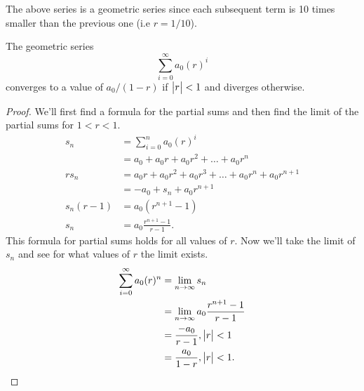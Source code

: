 The above series is a geometric series since each subsequent term is 10 times smaller than the previous one (i.e $r=1/10$).
\begin{lemma}
	The geometric series
	\begin{equation*}
		\sum_{i=0}^{\infty}{a_0(r)^i}
	\end{equation*}
	converges to a value of $a_0/(1-r)$ if $\big\lvert r \big\rvert < 1$ and diverges otherwise.
\end{lemma}
\begin{proof}
	We'll first find a formula for the partial sums and then find the limit of the partial sums for $1 < r < 1$.
	\begin{align*}
		s_n &= \sum_{i=0}^{n}{a_0(r)^i} \\
		&= a_0 + a_0r + a_0r^2 + \ldots + a_0r^n \\
		rs_n &= a_0r + a_0r^2 + a_0r^3 + \ldots + a_0r^n + a_0r^{n+1} \\
		&= -a_0 + s_n + a_0r^{n+1} \\
		s_n(r-1) &= a_0\left(r^{n+1} - 1\right) \\
		s_n &= a_0\frac{r^{n+1}-1}{r-1}.
	\end{align*}
	This formula for partial sums holds for all values of $r$.
	Now we'll take the limit of $s_n$ and see for what values of $r$ the limit exists.
	\begin{align*}
		\sum_{i=0}^{\infty}{a_0(r)^n} &= \lim_{n\to\infty}{s_n} \\
		&= \lim_{n\to\infty}{a_0\frac{r^{n+1}-1}{r-1}} \\
		&= \frac{-a_0}{r-1}, \big\lvert r \big\rvert < 1 \\
		&= \frac{a_0}{1-r}, \big\lvert r \big\rvert < 1.
	\end{align*}
\end{proof}

